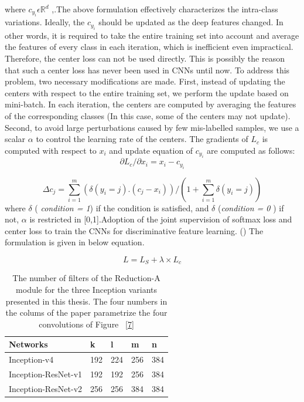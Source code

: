 \documentclass[a4paper,12pt, twoside]{NITKReport}
\begin{document}
\par where $c_{y_{i}} \epsilon \mathbb{R}^{d}$ ,.The above formulation effectively characterizes the intra-class variations. Ideally, the $c_{y_{i}}$ should be updated as the deep features changed. In other words, it is required to take the entire training set into account and average the features of every class in each iteration, which is inefficient even impractical. Therefore, the center loss can not be used directly. This is possibly the reason that such a center loss has never been used in CNNs until now. To address this problem, two necessary modifications are made. First, instead of updating the centers with respect to the entire training set, we perform the update based on mini-batch. In each iteration, the centers are computed by averaging the features of the corresponding classes (In this case, some of the centers may not update). Second, to avoid large perturbations caused by few mis-labelled samples, we use a scalar $\alpha$ to control the learning rate of the centers. The gradients of $L_{c}$ is computed with respect to $x{_{i}}$ and update equation of $c_{y_{i}}$ are computed as follows:
\begin{equation}
\partial L_{c} / \partial x_{i} = x_{i} - c_{y_{i}}
\end{equation}

\begin{equation}
\Delta c_{j}=\sum_{i=1}^{m} (\delta (y_{i}=j).(c_{j}-x{_i}) ) / (1+\sum_{i=1}^{m} \delta(y_{i}=j))
\end{equation}
where $\delta$ (\textit{ condition = 1}) if the condition is satisfied, and $\delta$ (\textit{condition = 0 }) if not, $\alpha$ is restricted in [0,1].Adoption of the joint supervision of softmax loss and center loss to train the CNNs for discriminative feature learning. (\cite{wen2016discriminative}) The formulation is given in below equation.

\begin{equation}
L = L_{S} + \lambda \times L_{c} 
\end{equation}

\begin{table}
  \centering
\begin{tabular}{ |p{5cm}|p{2.5cm}|p{2.5cm}|p{2.5cm}|p{2.5cm}|}
 \hline
 Networks & k & l & m & n\\
 \hline
 Inception-v4 & 192 & 224 & 256 & 384\\
 \hline
 Inception-ResNet-v1 & 192 & 192 & 256 & 384\\
 \hline
 Inception-ResNet-v2 & 256 & 256 & 384 & 384\\
 \hline
\end{tabular}
\caption{The number of filters of the Reduction-A module for the
three Inception variants presented in this thesis. The four numbers
in the colums of the paper parametrize the four convolutions of
Figure ~\ref{7}}\label{table:number_of_filters}
\end{table}
\end{document}
